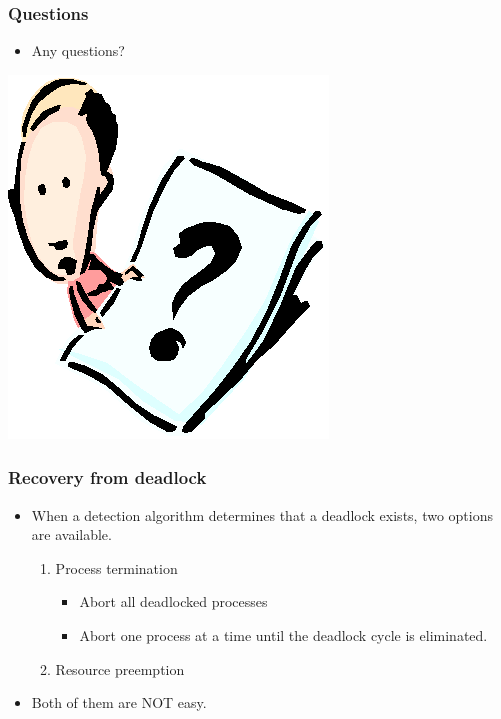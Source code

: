 \documentclass[CJKutf8,xcolor=pdftex,dvipsnames,table]{beamer}
\begin{document}
\begin{CJK*}{UTF8}{song}
  \begin{frame}
  \frametitle{Questions}
  \begin{itemize}
  \item{Any questions?}
  \end{itemize}
  \begin{center}
    \includegraphics[scale=.8]{question}
  \end{center}
  \end{frame}
  
  \begin{frame}
  \frametitle{Recovery from deadlock} \pause
  \begin{itemize}
  \item{When a detection algorithm determines that a deadlock exists, two options are available.} \pause
    \begin{enumerate}
    \item{Process termination} \pause
      \begin{itemize}
      \item{Abort all deadlocked processes} \pause
      \item{Abort one process at a time until the deadlock cycle is eliminated.} \pause
      \end{itemize}
    \item{Resource preemption} \pause
    \end{enumerate}
  \item{Both of them are NOT easy.}
  \end{itemize}
  \end{frame}
  

\end{CJK*}
\end{document}
